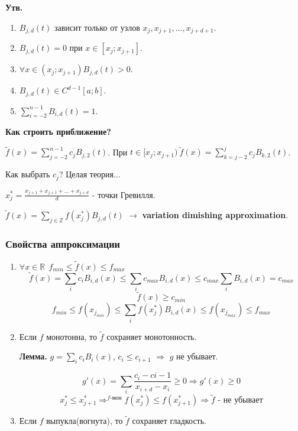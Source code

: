 \textbf{Утв.}
\begin{enumerate}
    \item $B_{j,d}(t)$ зависит только от узлов $ x_j, x_{j+1}, ..., x_{j+d+1} $.
    \item $ B_{j,d}(t) = 0 $ при $ x \in [x_j; x_{j+1}] $.
    \item $ \forall x \in (x_j; x_{j+1}) B_{j,d}(t) > 0 $.
    \item $ B_{j,d}(t) \in C^{d-1}[a; b] $.
    \item $ \sum_{i=-2}^{n-1} B_{i,d}(t) = 1 $.
\end{enumerate}

\textbf{Как строить приближение?}

$ \tilde{f}(x) = \sum_{j=-2}^{n-1} c_j B_{j,2}(t) $.
При $ t \in [x_j; x_{j+1})\ \tilde{f}(x) = \sum_{k=j-2}^{j} c_j B_{k,2}(t) $.

Как выбрать $c_j$? Целая теория...

$ x^*_j = \frac{x_{j+1} + x_{j+1} + ... + x_{j+d}}{d} $ - точки Гревилля.

$ \tilde{f}(x) = \sum_{j \in \mathbb{Z}} f(x^*_j) B_{j,d}(t) $ $\to$ \textbf{variation dimishing approximation}.

\subsubsection{Свойства аппроксимации}

\begin{enumerate}
    \item 
        $\forall x \in \mathbb{R}\ \ f_{min} \leq \tilde{f}(x) \leq f_{max}$
        \begin{equation}
            \tilde{f}(x) = \sum_i c_i B_{i,d}(x) \leq \sum_i c_{max} B_{i,d}(x) \leq c_{max} \sum_i B_{i,d}(x) = c_{max}
        \end{equation}
        \begin{equation}
            \tilde{f}(x) \geq c_{min}
        \end{equation}
        \begin{equation}
            f_{min} \leq f(x_{j_{min}}) \leq \sum_i f(x^*_j) B_{i,d}(x) \leq f(x_{j_{max}}) \leq f_{max}
        \end{equation}
    \item
        Если $f$ монотонна, то $\tilde{f}$ сохраняет монотонность.
        
        \textbf{Лемма.} 
        $ g = \sum_{i} c_i B_i(x) $, $ c_i \leq c_{i+1} $ $\Rightarrow$ $g$ не убывает.

        \begin{equation}
            g'(x) = \sum_{i} \frac{c_i - c{i-1}}{x_{i+d} - x_{i}} \geq 0 \Rightarrow g'(x) \geq 0
        \end{equation}
        \begin{equation}
            x^*_j \leq x^*_{j+1} \Rightarrow^{f \text{-мон}} f(x^*_j) \leq f(x^*_{j+1}) \Rightarrow \tilde{f} \text{ - не убывает}
        \end{equation}
    \item
        Если $f$ выпукла(вогнута), то $\tilde{f}$ сохраняет гладкость.
\end{enumerate}

